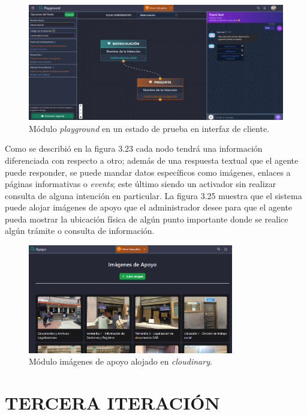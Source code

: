 \documentclass[letter, openright, 12pt]{book}
\begin{document}
\begin{figure}[H]
\centering
\includegraphics[width=1\textwidth]{figura3_24}
 \caption{Módulo {\it playground} en un estado de prueba en interfaz de cliente.  }
\label{fig:figura3_24}
\end{figure}

Como se describió en la figura 3.23 cada nodo tendrá una información diferenciada con respecto a otro; además de una respuesta textual que el agente puede responder, se puede mandar datos específicos como imágenes, enlaces a páginas informativas o {\it events}; este último siendo un activador sin realizar consulta de alguna intención en particular. La figura 3.25 muestra que el sistema puede alojar imágenes de apoyo que el administrador desee para que el agente pueda mostrar la ubicación física de algún punto importante donde se realice algún trámite o consulta de información. 

\begin{figure}[H]
\centering
\includegraphics[width=0.8\textwidth]{figura3_25}
 \caption{Módulo imágenes de apoyo alojado en {\it cloudinary}.  }
\label{fig:figura3_25}
\end{figure}

\section{TERCERA ITERACIÓN}
\end{document}
